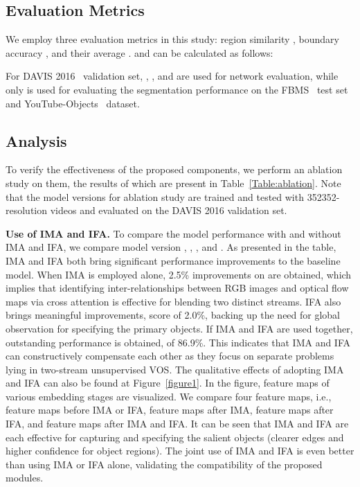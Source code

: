 \documentclass[10pt,twocolumn,letterpaper]{article}
\begin{document}
\subsection{Evaluation Metrics}
We employ three evaluation metrics in this study: region similarity , boundary accuracy , and their average .  and  can be calculated as follows:


For DAVIS 2016~\cite{DAVIS} validation set, , , and  are used for network evaluation, while only  is used for evaluating the segmentation performance on the FBMS~\cite{FBMS} test set and YouTube-Objects~\cite{YTOBJ} dataset.



\subsection{Analysis}
\label{analysis}
To verify the effectiveness of the proposed components, we perform an ablation study on them, the results of which are present in Table~\ref{Table:ablation}. Note that the model versions for ablation study are trained and tested with 352352-resolution videos and evaluated on the DAVIS 2016 validation set.


\noindent\textbf{Use of IMA and IFA.} To compare the model performance with and without IMA and IFA, we compare model version , , , and . As presented in the table, IMA and IFA both bring significant performance improvements to the baseline model. When IMA is employed alone, 2.5\% improvements on  are obtained, which implies that identifying inter-relationships between RGB images and optical flow maps via cross attention is effective for blending two distinct streams. IFA also brings meaningful improvements,  score of 2.0\%, backing up the need for global observation for specifying the primary objects. If IMA and IFA are used together, outstanding performance is obtained,  of 86.9\%. This indicates that IMA and IFA can constructively compensate each other as they focus on separate problems lying in two-stream unsupervised VOS. The qualitative effects of adopting IMA and IFA can also be found at Figure~\ref{figure1}. In the figure, feature maps of various embedding stages are visualized. We compare four feature maps, i.e., feature maps before IMA or IFA, feature maps after IMA, feature maps after IFA, and feature maps after IMA and IFA. It can be seen that IMA and IFA are each effective for capturing and specifying the salient objects (clearer edges and higher confidence for object regions). The joint use of IMA and IFA is even better than using IMA or IFA alone, validating the compatibility of the proposed modules.  
\end{document}
